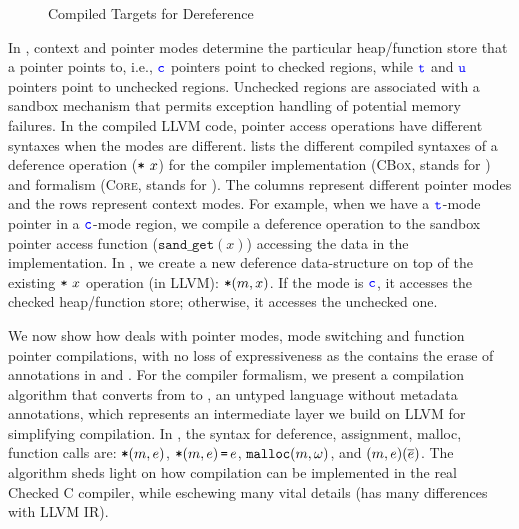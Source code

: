 {\begin{figure}[t!]
{}
\caption{Compiled Targets for Dereference}
\label{fig:flagtable}
\end{figure}

In \systemname, context and pointer modes determine the particular heap/function store that a pointer points to,
i.e., $\textcolor{blue}{\texttt{c}}$ pointers point to checked regions, while $\textcolor{blue}{\texttt{t}}$ and $\textcolor{blue}{\texttt{u}}$ pointers point to unchecked regions.
Unchecked regions are associated with a sandbox mechanism that permits exception handling of potential memory failures.
In the compiled LLVM code, pointer access operations have different syntaxes when the modes are different. 
 lists the different compiled syntaxes of a deference operation ($\texttt{*}~{x}$) for the compiler implementation (\textsc{CBox}, stands for \systemname) and formalism (\textsc{Core}, stands for \lang). The columns represent different pointer modes and the rows represent context modes.
For example, when we have a $\textcolor{blue}{\texttt{t}}$-mode pointer in a $\textcolor{blue}{\texttt{c}}$-mode region, we compile a deference operation to the sandbox pointer access function ($\texttt{sand\_get}(x)$) accessing the data in the \systemname implementation. In \lang, we create a new deference data-structure on top of the existing $\texttt{*}~{x}$ operation (in LLVM): $\texttt{*}({m},{x})$. If the mode is $\textcolor{blue}{\texttt{c}}$, it accesses the checked heap/function store; otherwise, it accesses the unchecked one.

We now show how \lang deals with pointer modes, mode switching and function pointer compilations, 
with no loss of expressiveness
as the \checkedc contains the erase of annotations in \cite{li22checkedc} and .
For the compiler formalism, 
we present a compilation algorithm that converts from
\lang to \elang, an untyped language without metadata
annotations, which represents an intermediate layer we build on LLVM for simplifying compilation. 
In \elang, the syntax for deference, assignment, malloc, function calls are: $\texttt{*}({m},{e})$, $\texttt{*}{(m,e)}\,\texttt{=}\, {e}$, 
$\mathtt{malloc}({m},{\omega})$, and ${(m,e)}({\overline{e}})$.
The algorithm sheds
  light on how compilation can be implemented in the real Checked C
  compiler, while eschewing many vital details (\elang has many 
  differences with LLVM IR).



}
